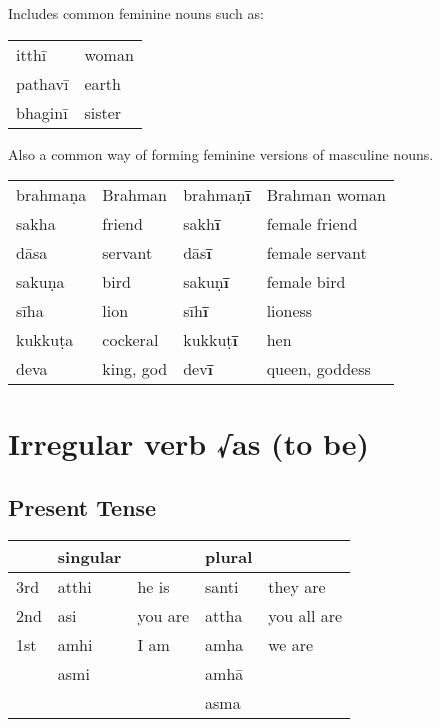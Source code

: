 \documentclass[11pt,oneside]{memoir}
\begin{document}
Includes common feminine nouns such as:

\begin{center}
\begin{tabular}{ll}
itthī & woman\\[0pt]
pathavī & earth\\[0pt]
bhaginī & sister\\[0pt]
\end{tabular}
\end{center}

Also a common way of forming feminine versions of masculine nouns.

\begin{center}
\begin{tabular}{llll}
brahmaṇa & Brahman & brahmaṇ\textbf{ī} & Brahman woman\\[0pt]
sakha & friend & sakh\textbf{ī} & female friend\\[0pt]
dāsa & servant & dās\textbf{ī} & female servant\\[0pt]
sakuṇa & bird & sakuṇ\textbf{ī} & female bird\\[0pt]
sīha & lion & sīh\textbf{ī} & lioness\\[0pt]
kukkuṭa & cockeral & kukkuṭ\textbf{ī} & hen\\[0pt]
deva & king, god & dev\textbf{ī} & queen, goddess\\[0pt]
\end{tabular}
\end{center}

\clearpage

\section{Irregular verb √as (to be)}
\label{sec:orgc48c32c}
\subsection{Present Tense}
\label{sec:org383d252}

\begin{center}
\begin{tabular}{lllll}
 & singular &  & plural & \\[0pt]
\hline
3rd & atthi & he is & santi & they are\\[0pt]
2nd & asi & you are & attha & you all are\\[0pt]
1st & amhi & I am & amha & we are\\[0pt]
 & asmi &  & amhā & \\[0pt]
 &  &  & asma & \\[0pt]
\end{tabular}
\end{center}
\end{document}
